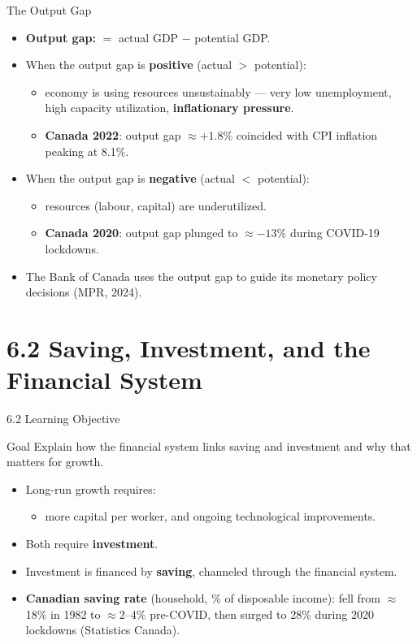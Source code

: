 \documentclass[aspectratio=169]{beamer}
\begin{document}
\begin{frame}{The Output Gap}
\transfade
\begin{itemize}[<+->]
  \item \textbf{Output gap:} $= $ actual GDP $-$ potential GDP.
  \item When the output gap is \textbf{positive} (actual $>$ potential):
  \begin{itemize}[<+->]
    \item economy is using resources \alert{unsustainably} --- very low unemployment, high capacity utilization, \textbf{inflationary pressure}.
    \item \textbf{Canada 2022}: output gap $\approx +1.8\%$ coincided with CPI inflation peaking at \alert{8.1\%}.
  \end{itemize}
  \item When the output gap is \textbf{negative} (actual $<$ potential):
  \begin{itemize}[<+->]
    \item resources (labour, capital) are \alert{underutilized}.
    \item \textbf{Canada 2020}: output gap plunged to $\approx -13\%$ during COVID-19 lockdowns.
  \end{itemize}
  \item The Bank of Canada uses the output gap to guide its monetary policy decisions (MPR, 2024).
\end{itemize}
\end{frame}

\section{6.2 Saving, Investment, and the Financial System}

\begin{frame}{6.2 Learning Objective}
\transfade
\begin{block}{Goal}
Explain how the financial system links saving and investment and why that matters for growth.
\end{block}
\begin{itemize}[<+->]
  \item Long-run growth requires:
  \begin{itemize}[<+->]
    \item more capital per worker, and ongoing technological improvements.
  \end{itemize}
  \item Both require \textbf{investment}.
  \item Investment is financed by \textbf{saving}, channeled through the financial system.
  \item \textbf{Canadian saving rate} (household, \% of disposable income): fell from $\approx$18\% in 1982 to $\approx$2--4\% pre-COVID, then \alert{surged} to 28\% during 2020 lockdowns (Statistics Canada).
\end{itemize}
\end{frame}
\end{document}
